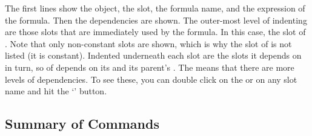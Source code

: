 The first lines show the object, the slot, the formula name, and the
expression of the formula.  Then the dependencies are shown.  The
outer-most level of indenting are those slots that are immediately
used by the formula.  In this case, the  slot of
.  Note that only non-constant slots
are shown,
which is why the  slot of  is not listed (it
is constant).  Indented underneath each slot are the slots it depends
on in turn, so  of 
depends on its  and its parent's .  The
 means that there are more levels of dependencies.  To see
these, you can double click on the  or on any slot name and
hit the `' button.

\subsection{Summary of Commands}

